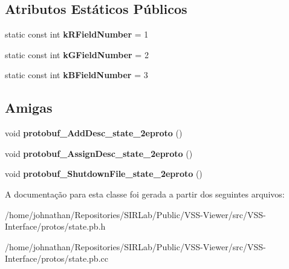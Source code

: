 \subsection*{Atributos Estáticos Públicos}
\begin{DoxyCompactItemize}
\item 
static const int {\bfseries k\+R\+Field\+Number} = 1\hypertarget{classvss__state_1_1RGB_a6b14019e7583f983a0dc0e0c713767e5}{}\label{classvss__state_1_1RGB_a6b14019e7583f983a0dc0e0c713767e5}

\item 
static const int {\bfseries k\+G\+Field\+Number} = 2\hypertarget{classvss__state_1_1RGB_a7f4f93a87024582ed9aa94ad501aacc0}{}\label{classvss__state_1_1RGB_a7f4f93a87024582ed9aa94ad501aacc0}

\item 
static const int {\bfseries k\+B\+Field\+Number} = 3\hypertarget{classvss__state_1_1RGB_a2c4583771ba2ee5b0f6798c7ee082b3e}{}\label{classvss__state_1_1RGB_a2c4583771ba2ee5b0f6798c7ee082b3e}

\end{DoxyCompactItemize}
\subsection*{Amigas}
\begin{DoxyCompactItemize}
\item 
void {\bfseries protobuf\+\_\+\+Add\+Desc\+\_\+state\+\_\+2eproto} ()\hypertarget{classvss__state_1_1RGB_aab1a2c258f8122a403a979ff57e2a706}{}\label{classvss__state_1_1RGB_aab1a2c258f8122a403a979ff57e2a706}

\item 
void {\bfseries protobuf\+\_\+\+Assign\+Desc\+\_\+state\+\_\+2eproto} ()\hypertarget{classvss__state_1_1RGB_a57d9367bc8a7a94ead11d11194cca1b6}{}\label{classvss__state_1_1RGB_a57d9367bc8a7a94ead11d11194cca1b6}

\item 
void {\bfseries protobuf\+\_\+\+Shutdown\+File\+\_\+state\+\_\+2eproto} ()\hypertarget{classvss__state_1_1RGB_a4e6dc5e8e72799859c4e9556d090e57d}{}\label{classvss__state_1_1RGB_a4e6dc5e8e72799859c4e9556d090e57d}

\end{DoxyCompactItemize}


A documentação para esta classe foi gerada a partir dos seguintes arquivos\+:\begin{DoxyCompactItemize}
\item 
/home/johnathan/\+Repositories/\+S\+I\+R\+Lab/\+Public/\+V\+S\+S-\/\+Viewer/src/\+V\+S\+S-\/\+Interface/protos/state.\+pb.\+h\item 
/home/johnathan/\+Repositories/\+S\+I\+R\+Lab/\+Public/\+V\+S\+S-\/\+Viewer/src/\+V\+S\+S-\/\+Interface/protos/state.\+pb.\+cc\end{DoxyCompactItemize}
